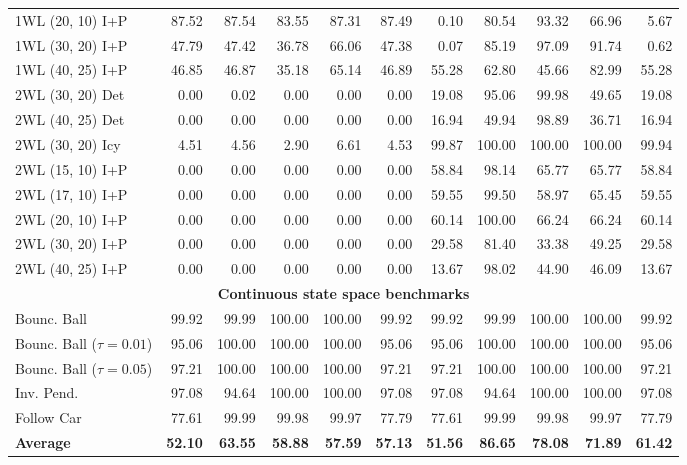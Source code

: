 {\begin{tabular}{|l|rrrrr|rrrrr|}
1WL (20, 10) I+P & 87.52 & 87.54 & 83.55 & 87.31 & 87.49 & 0.10 & 80.54 & 93.32 & 66.96 & 5.67 \\
1WL (30, 20) I+P & 47.79 & 47.42 & 36.78 & 66.06 & 47.38 & 0.07 & 85.19 & 97.09 & 91.74 & 0.62 \\
1WL (40, 25) I+P & 46.85 & 46.87 & 35.18 & 65.14 & 46.89 & 55.28 & 62.80 & 45.66 & 82.99 & 55.28 \\
\hline
2WL (30, 20) Det & 0.00 & 0.02 & 0.00 & 0.00 & 0.00 & 19.08 & 95.06 & 99.98 & 49.65 & 19.08 \\
2WL (40, 25) Det & 0.00 & 0.00 & 0.00 & 0.00 & 0.00 & 16.94 & 49.94 & 98.89 & 36.71 & 16.94 \\
\hline
2WL (30, 20) Icy & 4.51 & 4.56 & 2.90 & 6.61 & 4.53 & 99.87 & 100.00 & 100.00 & 100.00 & 99.94 \\
\hline
2WL (15, 10) I+P & 0.00 & 0.00 & 0.00 & 0.00 & 0.00 & 58.84 & 98.14 & 65.77 & 65.77 & 58.84 \\
2WL (17, 10) I+P & 0.00 & 0.00 & 0.00 & 0.00 & 0.00 & 59.55 & 99.50 & 58.97 & 65.45 & 59.55 \\
2WL (20, 10) I+P & 0.00 & 0.00 & 0.00 & 0.00 & 0.00 & 60.14 & 100.00 & 66.24 & 66.24 & 60.14 \\
2WL (30, 20) I+P & 0.00 & 0.00 & 0.00 & 0.00 & 0.00 & 29.58 & 81.40 & 33.38 & 49.25 & 29.58 \\
2WL (40, 25) I+P & 0.00 & 0.00 & 0.00 & 0.00 & 0.00 & 13.67 & 98.02 & 44.90 & 46.09 & 13.67 \\
\hline
\multicolumn{11}{|c|}{\textbf{Continuous state space benchmarks}}\\\hline
Bounc. Ball & 99.92 & 99.99 & 100.00 & 100.00 & 99.92 & 99.92 & 99.99 & 100.00 & 100.00 & 99.92 \\
Bounc. Ball ($\tau=0.01$) & 95.06 & 100.00 & 100.00 & 100.00 & 95.06 & 95.06 & 100.00 & 100.00 & 100.00 & 95.06 \\
Bounc. Ball ($\tau=0.05$) & 97.21 & 100.00 & 100.00 & 100.00 & 97.21 & 97.21 & 100.00 & 100.00 & 100.00 & 97.21 \\
\hline
Inv. Pend. & 97.08 & 94.64 & 100.00 & 100.00 & 97.08 & 97.08 & 94.64 & 100.00 & 100.00 & 97.08 \\
\hline
Follow Car & 77.61 & 99.99 & 99.98 & 99.97 & 77.79 & 77.61 & 99.99 & 99.98 & 99.97 & 77.79 \\
\hline
\textbf{Average} & \textbf{52.10} & \textbf{63.55} & \textbf{58.88} & \textbf{57.59} & \textbf{57.13} & \textbf{51.56} & \textbf{86.65} & \textbf{78.08} & \textbf{71.89} & \textbf{61.42} \\
\hline
\end{tabular}}
